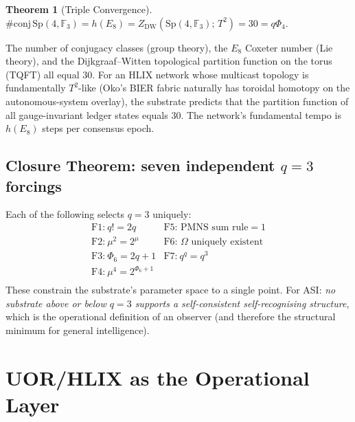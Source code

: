 \documentclass[11pt,letterpaper]{article}
\newtheorem{theorem}{Theorem}
\theoremstyle{remark}
\newcommand{\Sp}{\mathrm{Sp}}
\newcommand{\FF}{\mathbb{F}}
\begin{document}
\begin{theorem}[Triple Convergence]\label{thm:triple}
$\#\mathrm{conj}\,\Sp(4,\FF_3) = h(E_8) = Z_{\mathrm{DW}}(\Sp(4,\FF_3);\,T^2) = 30 = q\Phi_4.$
\end{theorem}
The number of conjugacy classes (group theory), the $E_8$ Coxeter number (Lie theory), and
the Dijkgraaf--Witten topological partition function on the torus (TQFT) all equal $30$.
For an HLIX network whose multicast topology is fundamentally $T^2$-like (Oko's BIER fabric
naturally has toroidal homotopy on the autonomous-system overlay), the substrate predicts
that the partition function of all gauge-invariant ledger states equals $30$. The network's
fundamental tempo is $h(E_8)$ steps per consensus epoch.

\subsection{Closure Theorem: seven independent $q=3$ forcings}
Each of the following selects $q=3$ uniquely:
\[
\renewcommand{\arraystretch}{1.15}
\begin{array}{ll}
\text{F1:}\ q!=2q & \text{F5: PMNS sum rule}=1\\
\text{F2:}\ \mu^2=2^\mu & \text{F6: }\Omega\text{ uniquely existent} \\
\text{F3:}\ \Phi_6=2q+1 & \text{F7:}\ q^q=q^3\\
\text{F4:}\ \mu^4=2^{\Phi_6+1} & \\
\end{array}
\]
These constrain the substrate's parameter space to a single point. For ASI: \emph{no
substrate above or below $q=3$ supports a self-consistent self-recognising structure},
which is the operational definition of an observer (and therefore the structural minimum
for general intelligence).

\section{UOR/HLIX as the Operational Layer}
\end{document}
